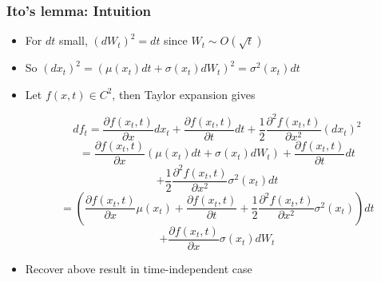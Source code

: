 \documentclass[bigger,handout]{beamer}
\begin{document}
\begin{frame}%
\frametitle{Ito's lemma: Intuition}

\begin{itemize}

\item For $dt$ small, $(dW_t)^2=dt$ since $W_t\sim O(\sqrt{t})$
\item So $(dx_t)^{2}=(\mu(x_t)dt+\sigma(x_t)dW_t)^2=\sigma^2(x_t)dt$
\item Let $f(x,t)\in C^2$, then Taylor expansion gives

\begin{equation*}
df_t=\frac{\partial f(x_t,t)}{\partial x}dx_{t}+\frac{\partial f(x_t,t)}{\partial t}dt+\frac{1}{2}\frac{\partial^2 f(x_t,t)}{\partial x^2}(dx_t)^2
\end{equation*}
\begin{equation*}
=\frac{\partial f(x_t,t)}{\partial x}\left(\mu(x_t)dt+\sigma(x_t)dW_t\right)+\frac{\partial f(x_t,t)}{\partial t}dt
\end{equation*}
\begin{equation*}
+\frac{1}{2}\frac{\partial^2 f(x_t,t)}{\partial x^2}\sigma^2(x_t)dt
\end{equation*}
\begin{equation*}
=\left(\frac{\partial f(x_t,t)}{\partial x}\mu(x_t) +\frac{\partial f(x_t,t)}{\partial t}+\frac{1}{2}\frac{\partial^2 f(x_t,t)}{\partial x^2}\sigma^2(x_t)\right)dt
\end{equation*}
\begin{equation*}
+\frac{\partial f(x_t,t)}{\partial x}\sigma(x_t)dW_t
\end{equation*}
\item Recover above result in time-independent case


\end{itemize}


\end{frame}%
\end{document}
